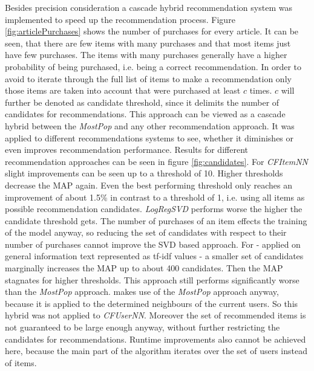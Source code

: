 \documentclass[10pt]{reportMaster}
\begin{document}
Besides precision consideration a cascade hybrid recommendation system was implemented to speed up the recommendation process.
Figure \ref{fig:articlePurchases} shows the number of purchases for every article.
It can be seen, that there are few items with many purchases and that most items just have few purchases.
The items with many purchases generally have a higher probability of being purchased, i.e. being a correct recommendation.
In order to avoid to iterate through the full list of items to make a recommendation only those items are taken into account that were purchased at least $c$ times.
$c$ will further be denoted as candidate threshold, since it delimits the number of candidates for recommendations.
This approach can be viewed as a cascade hybrid between the \textit{MostPop} and any other recommendation approach.
It was applied to different recommendations systems to see, whether it diminishes or even improves recommendation performance.
Results for different recommendation approaches can be seen in figure \ref{fig:candidates}.
For \textit{CFItemNN} slight improvements can be seen up to a threshold of 10.
Higher thresholds decrease the MAP again.
Even the best performing threshold only reaches an improvement of about 1.5\% in contrast to a threshold of 1, i.e. using all items as possible recommendation candidates.
\textit{LogRegSVD} performs worse the higher the candidate threshold gets.
The number of purchases of an item effects the training of the model anyway, so reducing the set of candidates with respect to their number of purchases cannot improve the SVD based approach.
For  - applied on general information text represented as tf-idf values - a smaller set of candidates marginally increases the MAP up to about 400 candidates.
Then the MAP stagnates for higher thresholds.
This approach still performs significantly worse than the \textit{MostPop} approach.
 makes use of the \textit{MostPop} approach anyway, because it is applied to the determined neighbours of the current users.
So this hybrid was not applied to \textit{CFUserNN}.
Moreover the set of recommended items is not guaranteed to be large enough anyway, without further restricting the candidates for recommendations.
Runtime improvements also cannot be achieved here, because the main part of the algorithm iterates over the set of users instead of items.
\end{document}
